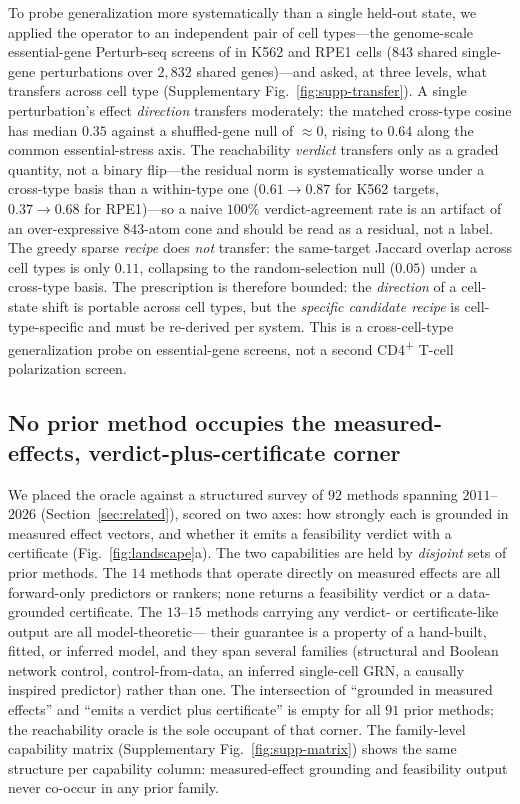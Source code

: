 To probe generalization more systematically than a single held-out state, we applied the
operator to an independent pair of cell types---the genome-scale essential-gene Perturb-seq
screens of \citet{Replogle2022} in K562 and RPE1 cells ($843$ shared single-gene perturbations
over $2{,}832$ shared genes)---and asked, at three levels, what transfers across cell type
(Supplementary Fig.~\ref{fig:supp-transfer}). A single perturbation's effect \emph{direction}
transfers moderately: the matched cross-type cosine has median $0.35$ against a shuffled-gene
null of $\approx0$, rising to $0.64$ along the common essential-stress axis. The reachability
\emph{verdict} transfers only as a graded quantity, not a binary flip---the residual norm is
systematically worse under a cross-type basis than a within-type one ($0.61\rightarrow0.87$ for
K562 targets, $0.37\rightarrow0.68$ for RPE1)---so a naive $100\%$ verdict-agreement rate is an
artifact of an over-expressive $843$-atom cone and should be read as a residual, not a label.
The greedy sparse \emph{recipe} does \emph{not} transfer: the same-target Jaccard overlap across cell
types is only $0.11$, collapsing to the random-selection null ($0.05$) under a cross-type basis.
The prescription is therefore bounded: the \emph{direction} of a cell-state shift is portable
across cell types, but the \emph{specific candidate recipe} is cell-type-specific and must be
re-derived per system. This is a cross-cell-type generalization probe on essential-gene screens,
not a second CD4\textsuperscript{+} T-cell polarization screen.

\subsection{No prior method occupies the measured-effects, verdict-plus-certificate corner}
\label{sec:results-landscape}
We placed the oracle against a structured survey of $92$ methods spanning $2011$--$2026$
(Section~\ref{sec:related}), scored on two axes: how strongly each is grounded in measured
effect vectors, and whether it emits a feasibility verdict with a certificate
(Fig.~\ref{fig:landscape}a). The two capabilities are held by \emph{disjoint} sets of prior
methods. The $14$ methods that operate directly on measured effects are all forward-only
predictors or rankers; none returns a feasibility verdict or a data-grounded certificate. The
$13$--$15$ methods carrying any verdict- or certificate-like output are all model-theoretic---%
their guarantee is a property of a hand-built, fitted, or inferred model, and they span
several families (structural and Boolean network control, control-from-data, an inferred
single-cell GRN, a causally inspired predictor) rather than one. The intersection of
``grounded in measured effects'' and ``emits a verdict plus certificate'' is empty for all
$91$ prior methods; the reachability oracle is the sole occupant of that corner. The
family-level capability matrix (Supplementary Fig.~\ref{fig:supp-matrix}) shows the same
structure per capability column: measured-effect grounding and feasibility output never
co-occur in any prior family.

